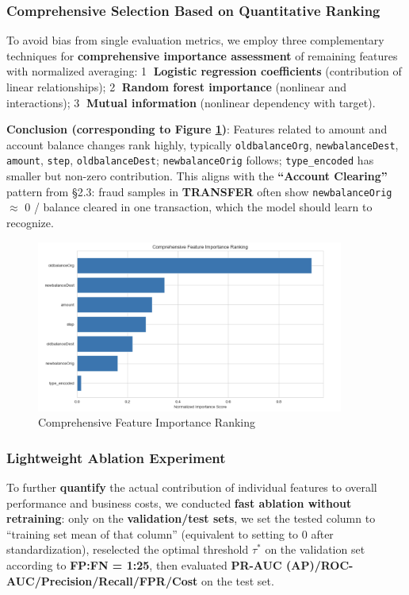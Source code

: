 \documentclass[sigplan,screen]{acmart}
\begin{document}
\subsubsection{Comprehensive Selection Based on Quantitative Ranking}

To avoid bias from single evaluation metrics, we employ three complementary techniques for \textbf{comprehensive importance assessment} of remaining features with normalized averaging:
\textcircled{1} \textbf{Logistic regression coefficients} (contribution of linear relationships); \textcircled{2} \textbf{Random forest importance} (nonlinear and interactions); \textcircled{3} \textbf{Mutual information} (nonlinear dependency with target).

\textbf{Conclusion (corresponding to Figure \ref{fig:feature_importance})}: Features related to amount and account balance changes rank highly, typically \texttt{oldbalanceOrg}, \texttt{newbalanceDest}, \texttt{amount}, \texttt{step}, \texttt{oldbalanceDest}; \texttt{newbalanceOrig} follows; \texttt{type\_encoded} has smaller but non-zero contribution. This aligns with the \textbf{``Account Clearing''} pattern from \S2.3: fraud samples in \textbf{TRANSFER} often show \texttt{newbalanceOrig} $\approx$ 0 / balance cleared in one transaction, which the model should learn to recognize.

\begin{figure}[h!]
    \centering
    \includegraphics[width=0.9\textwidth]{4.1.png}
    \caption{Comprehensive Feature Importance Ranking}
    \label{fig:feature_importance}
\end{figure}

\subsubsection{Lightweight Ablation Experiment}

To further \textbf{quantify} the actual contribution of individual features to overall performance and business costs, we conducted \textbf{fast ablation without retraining}: only on the \textbf{validation/test sets}, we set the tested column to ``training set mean of that column'' (equivalent to setting to 0 after standardization), reselected the optimal threshold $\tau^*$ on the validation set according to \textbf{FP:FN = 1:25}, then evaluated \textbf{PR-AUC (AP)/ROC-AUC/Precision/Recall/FPR/Cost} on the test set.
\end{document}

